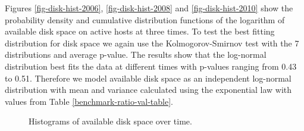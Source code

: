\documentclass[conference]{IEEEtran}
\begin{document}
Figures \ref{fig-disk-hist-2006}, \ref{fig-disk-hist-2008}
and \ref{fig-disk-hist-2010} show the probability density and cumulative distribution functions of the logarithm of available disk space on active hosts at three times.
To test the best fitting distribution for disk space we again use the Kolmogorov-Smirnov test with the 7 distributions and average p-value.  The results show that the log-normal distribution best fits the data at different times with p-values ranging from 0.43 to 0.51.  Therefore we model available disk space as an independent log-normal distribution with mean and variance calculated using the exponential law with values from Table \ref{benchmark-ratio-val-table}.

\begin{figure}
\centering
{}
\label{fig-disk-hist-all}
\caption{Histograms of available disk space over time.}
\end{figure}
\end{document}
